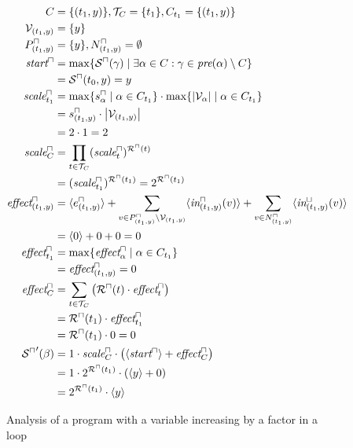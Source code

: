 \begin{figure}
\begin{align*}
  C &= \lbrace (t_1,y) \rbrace, \mathcal{T}_C = \lbrace t_1 \rbrace, C_{t_1} = \lbrace (t_1,y) \rbrace \\
  \mathcal{V}_{(t_1,y)} &= \lbrace y \rbrace \\
  P^\sqcap_{(t_1,y)} &= \lbrace y \rbrace, N^\sqcap_{(t_1,y)} = \emptyset \\
  \emph{start}^\sqcap &= \max \lbrace {\mathcal{S}^\sqcap}(\gamma) \mid \exists \alpha \in C: \gamma \in \emph{pre}(\alpha) \setminus C \rbrace \\
  &= {\mathcal{S}^\sqcap}(t_0,y) = y \\
  \emph{scale}^\sqcap_{t_1} &= \max \lbrace s^\sqcap_\alpha \mid \alpha \in C_{t_1} \rbrace \cdot \max \lbrace \left|\mathcal{V}_\alpha\right| \mid \alpha \in C_{t_1} \rbrace \\
  &= s^\sqcap_{(t_1,y)} \cdot \left|\mathcal{V}_{(t_1,y)}\right| \\
  &= 2 \cdot 1 = 2 \\
  \emph{scale}^\sqcap_C &= \prod_{t \in \mathcal{T}_C} (\emph{scale}^\sqcap_t)^{{\mathcal{R}^\sqcap}(t)} \\
  &= (\emph{scale}^\sqcap_{t_1})^{{\mathcal{R}^\sqcap}(t_1)} = 2^{{\mathcal{R}^\sqcap}(t_1)} \\
  \emph{effect}^\sqcap_{(t_1,y)} &= \langle e^{\sqcap}_{(t_1,y)}\rangle + \sum_{v \in P_{(t_1,y)}^\sqcap \setminus \mathcal{V}_{(t_1,y)}} \langle\emph{in}^\sqcap_{(t_1,y)}(v)\rangle + \sum_{v \in N_{(t_1,y)}^\sqcap} \langle\emph{in}^\sqcup_{(t_1,y)}(v)\rangle \\
  &= \langle0\rangle + 0 + 0 = 0 \\
  \emph{effect}^\sqcap_{t_1} &= \max \lbrace \emph{effect}^\sqcap_\alpha \mid \alpha \in C_{t_1}  \rbrace \\
  &= \emph{effect}^\sqcap_{(t_1,y)} = 0 \\
  \emph{effect}^\sqcap_C &= \sum_{t \in \mathcal{T}_C} \left( {\mathcal{R}^\sqcap}(t) \cdot \emph{effect}^\sqcap_t \right) \\
  &= {\mathcal{R}^\sqcap}(t_1) \cdot \emph{effect}^\sqcap_{t_1} \\
  &= {\mathcal{R}^\sqcap}(t_1) \cdot 0 = 0 \\
  {\mathcal{S}^\sqcap}'(\beta) &= 1 \cdot \emph{scale}^\sqcap_C \cdot \left( \langle\emph{start}^\sqcap\rangle + \emph{effect}^\sqcap_C \right) \\
  &= 1 \cdot 2^{{\mathcal{R}^\sqcap}(t_1)} \cdot \left( \langle y\rangle + 0 \right) \\
  &= 2^{{\mathcal{R}^\sqcap}(t_1)} \cdot \langle y\rangle
\end{align*}

\caption{Analysis of a program with a variable increasing by a factor in a loop}
\label{fig:nontrivial_nodependency}
\end{figure}
